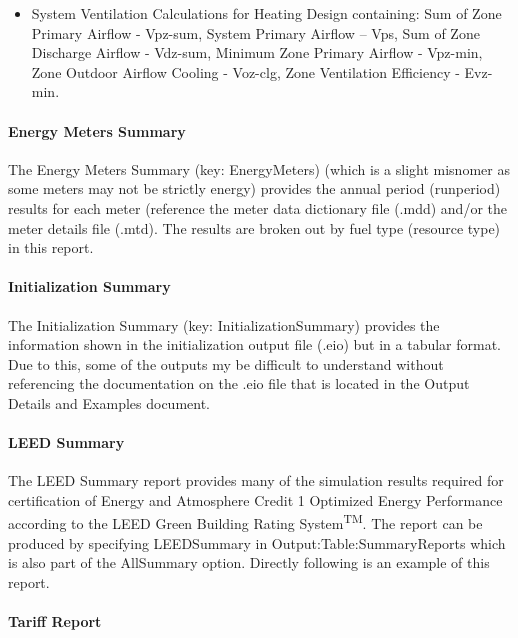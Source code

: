 \begin{itemize}
\item
  System Ventilation Calculations for Heating Design containing: Sum of Zone Primary Airflow - Vpz-sum, System Primary Airflow -- Vps, Sum of Zone Discharge Airflow - Vdz-sum, Minimum Zone Primary Airflow - Vpz-min, Zone Outdoor Airflow Cooling - Voz-clg, Zone Ventilation Efficiency - Evz-min.
\end{itemize}

\paragraph{Energy Meters Summary}\label{energy-meters-summary}

The Energy Meters Summary (key: EnergyMeters) (which is a slight misnomer as some meters may not be strictly energy) provides the annual period (runperiod) results for each meter (reference the meter data dictionary file (.mdd) and/or the meter details file (.mtd). The results are broken out by fuel type (resource type) in this report.

\paragraph{Initialization Summary}\label{initialization-summary}

The Initialization Summary (key: InitializationSummary) provides the information shown in the initialization output file (.eio) but in a tabular format. Due to this, some of the outputs my be difficult to understand without referencing the documentation on the .eio file that is located in the Output Details and Examples document.

\paragraph{LEED Summary}\label{leed-summary}

The LEED Summary report provides many of the simulation results required for certification of Energy and Atmosphere Credit 1 Optimized Energy Performance according to the LEED Green Building Rating System\textsuperscript{TM}. The report can be produced by specifying LEEDSummary in Output:Table:SummaryReports which is also part of the AllSummary option. Directly following is an example of this report.

\paragraph{Tariff Report}\label{TariffReport}

